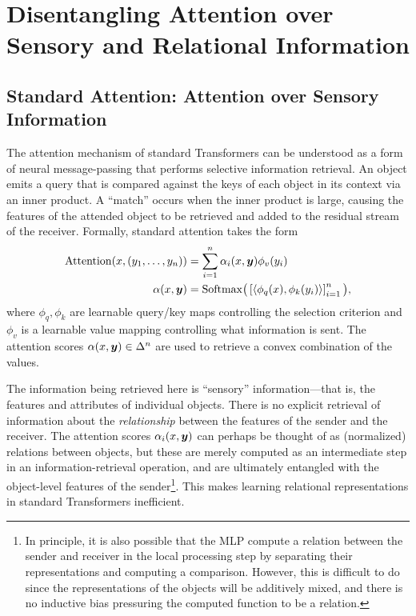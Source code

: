 \section{Disentangling Attention over Sensory and Relational Information}

\subsection{Standard Attention: Attention over Sensory Information}

The attention mechanism of standard Transformers can be understood as a form of neural message-passing that performs selective information retrieval. An object emits a query that is compared against the keys of each object in its context via an inner product. A ``match'' occurs when the inner product is large, causing the features of the attended object to be retrieved and added to the residual stream of the receiver. Formally, standard attention takes the form
\begin{equation}\label{eq:self_attn}
  \begin{split}
    \mathrm{Attention}(x, (y_1, \ldots, y_n)) &= \sum_{i=1}^{n} \alpha_i(x, \bm{y}) \phi_v(y_i) \\
    \alpha(x, \bm{y}) &= \mathrm{Softmax}\big(\left[\left \langle \phi_q(x), \phi_k(y_i) \right\rangle\right]_{i=1}^{n}\big),
  \end{split}
\end{equation}
where $\phi_q,\phi_k$ are learnable query/key maps controlling the selection criterion and $\phi_v$ is a learnable value mapping controlling what information is sent. The attention scores $\alpha(x, \bm{y}) \in \Delta^n$ are used to retrieve a convex combination of the values.

The information being retrieved here is ``sensory'' information---that is, the features and attributes of individual objects. There is no explicit retrieval of information about the \textit{relationship} between the features of the sender and the receiver. The attention scores $\alpha_i(x, \bm{y})$ can perhaps be thought of as (normalized) relations between objects, but these are merely computed as an intermediate step in an information-retrieval operation, and are ultimately entangled with the object-level features of the sender\footnote{In principle, it is also possible that the MLP compute a relation between the sender and receiver in the local processing step by separating their representations and computing a comparison. However, this is difficult to do since the representations of the objects will be additively mixed, and there is no inductive bias pressuring the computed function to be a relation.}. This makes learning relational representations in standard Transformers inefficient.

